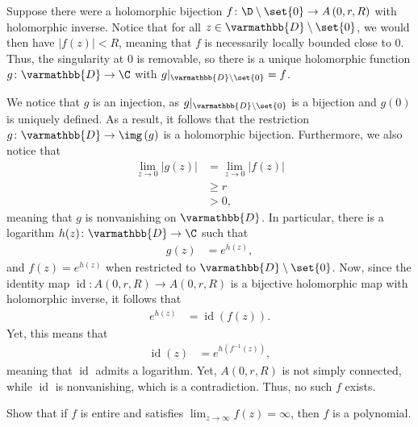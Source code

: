 \documentclass[10pt]{mypackage}
\renewcommand*{\mathbb}[1]{\varmathbb{#1}}
\begin{document}
\begin{solution}
  \color{gray}
  Suppose there were a holomorphic bijection $f\colon \D\setminus \set{0}\rightarrow A\left( 0,r,R \right)$ with holomorphic inverse. Notice that for all $z\in \mathbb{D}\setminus \set{0}$, we would then have $\left\vert f(z) \right\vert < R$, meaning that $f$ is necessarily locally bounded close to $0$. Thus, the singularity at $0$ is removable, so there is a unique holomorphic function $g\colon \mathbb{D}\rightarrow \C$ with $g|_{ \mathbb{D}\setminus \set{0} } = f$.\newline

  We notice that $ g $ is an injection, as $g|_{ \mathbb{D}\setminus \set{0} }$ is a bijection and $g(0)$ is uniquely defined. As a result, it follows that the restriction $g\colon \mathbb{D}\rightarrow \img\left( g \right)$ is a holomorphic bijection. Furthermore, we also notice that
  \begin{align*}
    \lim_{z\rightarrow 0} \left\vert g(z) \right\vert &= \lim_{z\rightarrow 0} \left\vert f(z) \right\vert\\
                                                      &\geq r\\
                                                      &> 0,
  \end{align*}
  meaning that $g$ is nonvanishing on $ \mathbb{D} $. In particular, there is a logarithm $h(z)\colon \mathbb{D}\rightarrow \C$ such that 
  \begin{align*}
    g(z) &= e^{h(z)},
  \end{align*}
  and $f(z) = e^{h(z)}$ when restricted to $ \mathbb{D}\setminus \set{0} $. Now, since the identity map $\operatorname{id}\colon A\left( 0,r,R \right)\rightarrow A\left( 0,r,R \right)$ is a bijective holomorphic map with holomorphic inverse, it follows that
  \begin{align*}
    e^{h(z)} &= \operatorname{id}\left( f(z) \right).
  \end{align*}
  Yet, this means that
  \begin{align*}
    \operatorname{id}(z) &= e^{h\left( f^{-1}(z) \right)},
  \end{align*}
  meaning that $ \operatorname{id} $ admits a logarithm. Yet, $A\left( 0,r,R \right)$ is not simply connected, while $ \operatorname{id} $ is nonvanishing, which is a contradiction. Thus, no such $f$ exists.
\end{solution}
\begin{problem}[Problem 4]
  Show that if $f$ is entire and satisfies $\lim_{z\rightarrow\infty} f\left( z \right) = \infty$, then $f$ is a polynomial.
\end{problem}
\end{document}
